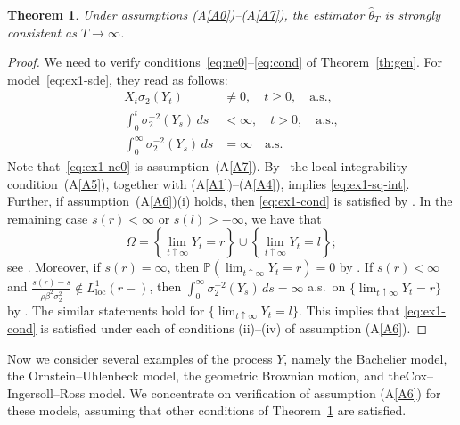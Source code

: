 \documentclass[numbers,compress,v1.0.1]{vmsta}
\newtheorem{thm}{Theorem}
\theoremstyle{remark}
\renewcommand{\P}{\mathbb P}
\newcommand*{\set}[1]{\left\{#1\right\}}
\newcommand{\lloc}{L^1_{\mathrm{loc}}}
\begin{document}
\begin{thm}\label{th:ex1}
Under assumptions \textup{(A\ref{A0})--(A\ref{A7})}, the
estimator $\hat{\theta}_T$ is strongly consistent as $T\to\infty$.
\end{thm}
%
\begin{proof}
We need to verify conditions~\eqref{eq:ne0}--\eqref{eq:cond} of
Theorem~\ref{th:gen}.
For model~\eqref{eq:ex1-sde}, they read as follows:
%
\begin{align}
X_t\sigma_2(Y_t)&\ne0, \quad t\ge0,\quad
\text{a.s.},\label{eq:ex1-ne0}
\\
\int_0^t\sigma_2^{-2}(Y_s)
\,ds&<\infty, \quad t>0,\quad\text{a.s.}, \label{eq:ex1-sq-int}
\\
\int_0^\infty\sigma_2^{-2}(Y_s)
\,ds&=\infty \quad\text{a.s.}\label{eq:ex1-cond}
\end{align}
%
Note that~\eqref{eq:ex1-ne0} is assumption~(A\ref{A7}).
By~\cite[Thm.~2.7]{miur} the local integrability condition~(A\ref{A5}),
together with (A\ref{A1})--(A\ref{A4}), implies \eqref{eq:ex1-sq-int}.
Further, if assumption~(A\ref{A6})(i) holds, then \eqref{eq:ex1-cond}
is satisfied by \cite[Thm. 2.11]{miur}. In the remaining case
$s(r)<\infty$ or $s(l)>-\infty$, we have that
%
\[
\varOmega=\set{\lim_{t\uparrow\infty} Y_t=r}\cup\set{\lim
_{t\uparrow\infty
} Y_t=l};
\]
%
see \cite{miur}.
Moreover, if $s(r)=\infty$, then
$\P (\lim_{t\uparrow\infty} Y_t=r )=0$ by \cite[Prop. 2.4]{miur}.
If $s(r)<\infty$ and
$\frac{s(r)-s}{\rho\beta^2\sigma_2^2}\notin\lloc(r-)$,
then
$\int_0^\infty\sigma_2^{-2}(Y_s)\,ds=\infty$
a.s.\ on $\{\lim_{t\uparrow\infty} Y_t=r\}$
by \cite[Thm. 2.12]{miur}.
The similar statements hold for $\{\lim_{t\uparrow\infty}
Y_t=l\}$. This implies that \eqref{eq:ex1-cond} is satisfied under each
of conditions (ii)--(iv) of assumption (A\ref{A6}).
\end{proof}

Now we consider several examples of the process $Y$, namely the
Bachelier model, the Ornstein--Uhlenbeck model, the geometric Brownian
motion, and the\break Cox--Ingersoll--Ross model.
We concentrate on verification of assumption (A\ref{A6}) for these
models, assuming that other conditions of Theorem~\ref{th:ex1} are satisfied.
\end{document}
